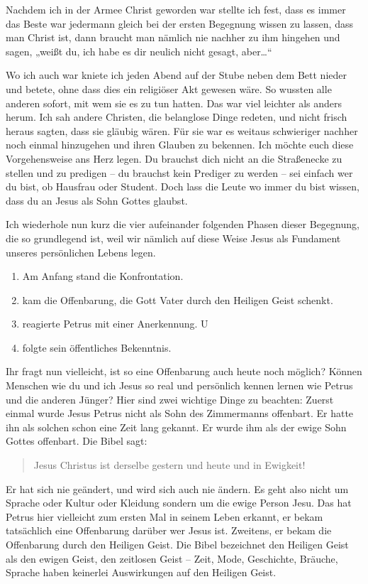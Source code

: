Nachdem ich in der Armee Christ geworden war stellte ich fest, dass es immer das Beste war jedermann gleich bei der ersten Begegnung wissen zu lassen, dass man Christ ist, dann braucht man nämlich nie nachher zu ihm hingehen und sagen, „weißt du, ich habe es dir neulich nicht gesagt, aber…“

Wo ich auch war kniete ich jeden Abend auf der Stube neben dem Bett nieder und betete, ohne dass dies ein religiöser Akt gewesen wäre. 
So wussten alle anderen sofort, mit wem sie es zu tun hatten. Das war viel leichter als anders herum. 
Ich sah andere Christen, die belanglose Dinge redeten, und nicht frisch heraus sagten, dass sie gläubig wären. 
Für sie war es weitaus schwieriger nachher noch einmal hinzugehen und ihren Glauben zu bekennen. 
Ich möchte euch diese Vorgehensweise ans Herz legen. 
Du brauchst dich nicht an die Straßenecke zu stellen und zu predigen – du brauchst kein Prediger zu werden – sei einfach wer du bist, ob Hausfrau oder Student. 
Doch lass die Leute wo immer du bist wissen, dass du an Jesus als Sohn Gottes glaubst.

Ich wiederhole nun kurz die vier aufeinander folgenden Phasen dieser Begegnung, die so grundlegend ist, weil wir nämlich auf diese Weise Jesus als Fundament unseres persönlichen Lebens legen.

\begin{enumerate}
  \item Am Anfang stand die Konfrontation.
  \item kam die Offenbarung, die Gott Vater durch den Heiligen Geist schenkt.
  \item reagierte Petrus mit einer Anerkennung.
  U\item folgte sein öffentliches Bekenntnis.
\end{enumerate}

Ihr fragt nun vielleicht, ist so eine Offenbarung auch heute noch möglich?
Können Menschen wie du und ich Jesus so real und persönlich kennen lernen wie Petrus und die anderen Jünger?
Hier sind zwei wichtige Dinge zu beachten: Zuerst einmal wurde Jesus Petrus nicht als Sohn des Zimmermanns offenbart.
Er hatte ihn als solchen schon eine Zeit lang gekannt.
Er wurde ihm als der ewige Sohn Gottes offenbart.
Die Bibel sagt:
\begin{quotation}
  Jesus Christus ist derselbe gestern und heute und in Ewigkeit!
\end{quotation}
Er hat sich nie geändert, und wird sich auch nie ändern.
Es geht also nicht um Sprache oder Kultur oder Kleidung sondern um die ewige Person Jesu.
Das hat Petrus hier vielleicht zum ersten Mal in seinem Leben erkannt, er bekam tatsächlich eine Offenbarung darüber wer Jesus ist.
Zweitens, er bekam die Offenbarung durch den Heiligen Geist.
Die Bibel bezeichnet den Heiligen Geist als den ewigen Geist, den zeitlosen Geist – Zeit, Mode, Geschichte, Bräuche, Sprache haben keinerlei Auswirkungen auf den Heiligen Geist. 

